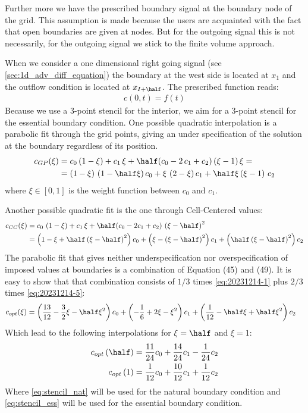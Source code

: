 Further more we have the prescribed boundary signal at the boundary node of the grid.
This assumption is made because the users are acquainted with the fact that open boundaries are given at nodes.
But for the outgoing signal this is not necessarily, for the outgoing signal we stick to the finite volume approach.

When we consider a one dimensional right going signal (see \autoref{sec:1d_adv_diff_equation}) the boundary at the west side is located at $x_1$ and the outflow condition is located at $x_{I+\half}$.
The prescribed function reads:
\begin{align}
    c(0,t) = f(t)
\end{align}
Because we use a 3-point stencil for the interior, we aim for a 3-point stencil for the essential boundary condition.
One possible quadratic interpolation is a parabolic fit through the grid points, giving an under specification of the solution at the boundary regardless of its position.
\begin{align}
    c_{GP}(\xi) & = c_0 \,  (1 - \xi) + c_1 \,  \xi + \half(c_0 - 2\, c_1 + c_2) \,  (\xi - 1) \,  \xi
    =
    \nonumber \\
    & =  \left(1 - \xi\right) \,  \left(1 - \half \xi\right) c_0  + \xi \,  \left(2 - \xi\right) c_1 + \half \xi  \left(\xi - 1\right) \,  c_2
    \label{eq:20231214-1}
\end{align}
where $\xi\in [0,1]$ is the weight function between $c_0$ and $c_1$.

Another possible quadratic fit is the one through Cell-Centered values:
\begin{align}
    c_{CC}(\xi) & = c_0 \, \left(1 - \xi\right) + c_1\,  \xi + \half (c_0 - 2c_1 + c_2) \,   \left(\xi - \half\right)^2
    \\
    & = \left( 1 - \xi + \half \left(\xi - \half\right)^2 \right) c_0 +
    \left( \xi - \left(\xi - \half\right)^2  \right) c_1  +
    \left(   \half \left(\xi - \half\right)^2\right) c_2       \label{eq:20231214-5}
\end{align}
The parabolic fit that gives neither underspecification nor overspecification of
imposed values at boundaries is a combination of Equation (45) and (49).
It is easy to show that that combination consists of $1/3$ times \autoref{eq:20231214-1} plus $2/3$ times \autoref{eq:20231214-5}:
\begin{align}
    c_{opt}(\xi) & = \left( \frac{13}{12} - \frac{3}{2}\xi - \half \xi^2 \right) c_0 +
    \left( -\frac{1}{6} + 2 \xi - \xi^2 \right) c_1  +
    \left( \frac{1}{12} - \half \xi +  \half \xi^2  \right) c_2
\end{align}
Which lead to the following interpolations for $\xi=\half$ and $\xi=1$:
\begin{align}
    c_{opt}\left(\half\right) & = \frac{11}{24} c_0 + \frac{14}{24} c_1 - \frac{1}{24} c_2 \label{eq:stencil_nat}
    \\
    c_{opt}\left(1\right)  & = \frac{1}{12} c_0 + \frac{10}{12} c_1 + \frac{1}{12}c_2 \label{eq:stencil_ess}
\end{align}
Where \autoref{eq:stencil_nat} will be used for the natural boundary condition and \autoref{eq:stencil_ess} will be used for the essential boundary condition.

